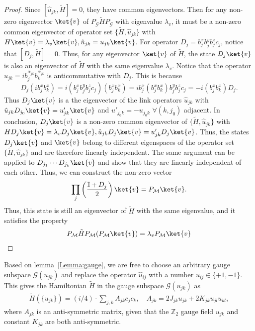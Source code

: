 \begin{proof}
Since $[\hat{u}_{jk}, \tilde{H}] = 0$, they have common eigenvectors.
Then for any non-zero eigenvector $\ket{v}$ of $P_{\mathcal{G}} \tilde{H} P_{\mathcal{G}}$ with eigenvalue $\lambda_v$, it must be a non-zero common eigenvector of operator set $ \{\tilde{H}, \hat u_{jk}\}$ with $H \ket{v} = \lambda_v \ket{v}, \hat u_{jk} = u_{jk} \ket{v}$.
For operator $D_j = b_j^x b_j^y b_j^z c_j$,  notice that $[D_j, \tilde{H}] = 0$. 
Thus, for any eigenvector $\ket{v}$ of $\tilde{H}$, the state $D_j \ket{v}$ is also an eigenvector of $\tilde{H}$ with the same eigenvalue $\lambda_v$.
Notice that the operator $\hat{u}_{jk} = i b_j^{\alpha_{jk}}b_k^{\alpha_{jk}}$ is anticommutative with $D_j$. This is because
\[
D_j (i b_j^x b_k^x) = i(b_j^x b_j^y b_j^z c_j)(b_j^x b_k^x) = i b_j^x (b_j^x b_k^x) b_j^y b_j^z c_j = -i (b_j^x b_k^x) D_j.
\]
Thus $D_j \ket{v}$ is a the eigenvector of the link operators $\hat u_{jk}$ with $\hat u_{jk} D_{j_0}\ket{v} = u_{jk}'\ket{v}$ and  $u'_{j_0k} = -u_{j_0k}$  $\forall (k, j_0)$ adjacent.
In conclusion, $D_j\ket{v}$ is a non-zero common eigenvector of  $ \{\tilde{H}, \hat u_{jk}\}$ with $H D_j\ket{v} = \lambda_v D_j\ket{v}, \hat u_{jk}D_j\ket{v} = u_{jk}' D_j\ket{v}$.
Thus, the states $D_j \ket{v}$ and $\ket{v}$ belong to different eigenspaces of the operator set $ \{\tilde{H}, \hat u_{jk}\}$ and are therefore linearly independent.
The same argument can be applied to $D_{j_1}\cdots D_{j_k} \ket{v}$ and show that they are linearly independent of each other.
Thus, we can construct the non-zero vector
\[
\prod_j \left(\frac{\mathbb{I} + D_j}{2}\right) \ket{v} = P_{\mathcal{M}}\ket{v}.
\]
Thus, this state is still an eigenvector of $\tilde{H}$ with the same eigenvalue, and it satisfies the property
\[
P_{\mathcal{M}} \tilde{H} P_{\mathcal{M}} (P_{\mathcal{M}}\ket{v}) = \lambda_v P_{\mathcal{M}}\ket{v}
\]
\end{proof}
Based on lemma~\ref{Lemma:gauge}, we are free to choose an arbitrary gauge subspace $\mathcal{G}(u_{jk}) $ and replace the operator $\hat u_{ij}$ with a number $u_{ij} \in \{+1,-1\}$. This gives the Hamiltonian $\tilde H$ in the gauge subspace $\mathcal{G}(u_{jk}) $ as
\begin{align}\label{eq:free_ferm}
    \tilde H(\{u_{jk}\}) =  ({i}/{4})\cdot \sum_{j,k} A_{jk} c_j c_k, \quad A_{jk} = 2J_{{jk}}u_{jk} + 2K_{jk}u_{jl} u_{kl},
\end{align}
where $A_{jk}$ is an anti-symmetric matrix, given that the $\mathbb{Z}_2$ gauge field $u_{jk}$ and constant $K_{jk}$ are both anti-symmetric.
